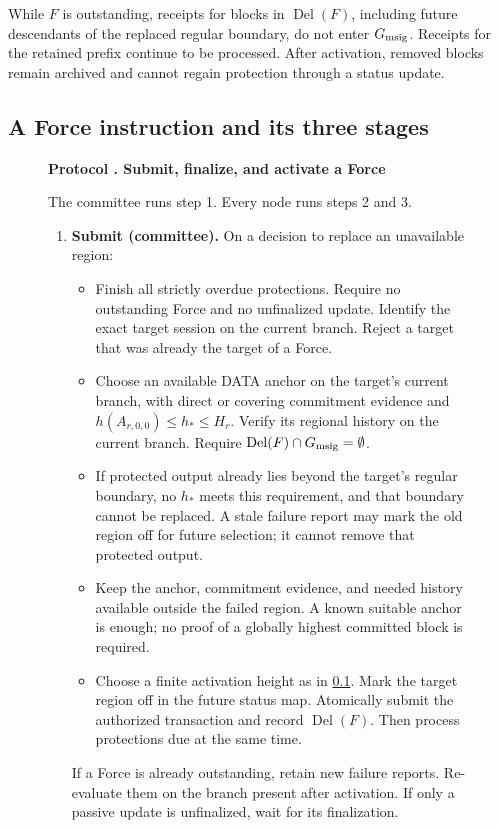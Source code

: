 \documentclass[11pt,a4paper]{article}
\newif\ifrevmarks
\newcommand{\Rv}[1]{\ifrevmarks\leavevmode{\color{rvBlue}#1}\else#1\fi}
\newcommand{\Cid}[1]{\ifrevmarks\textsuperscript{\hyperlink{chg:#1}{\color{rvBlue}\sffamily\scriptsize#1}}\fi}
\newcommand{\Del}{\operatorname{Del}}
\newcounter{protocol}
\newenvironment{protocol}[2]{\begin{figure}[htbp]\refstepcounter{protocol}\label{#1}
\begin{mdframed}[linewidth=.6pt,skipabove=0pt,skipbelow=0pt,
innertopmargin=7pt,innerbottommargin=7pt]\small
\textbf{Protocol \theprotocol. #2}\par\smallskip}{\end{mdframed}\end{figure}}
\begin{document}
\Rv{While $F$ is outstanding, receipts for blocks in $\Del(F)$, including
future descendants of the replaced regular boundary, do not enter
$G_{\rm msig}$.} Receipts for the retained prefix
continue to be processed. After activation, removed blocks remain
archived and cannot regain protection through a status update.

\subsection{A Force instruction and its three stages}
\label{sec:force-stages}

\begin{protocol}{alg:force}{Submit, finalize, and activate a Force}
The committee runs step 1. \Rv{Every node} runs steps 2 and 3.
\begin{enumerate}[label=\textbf{\arabic*)},itemsep=3pt]
\item \textbf{Submit \Rv{(committee)}.} On a decision to replace an unavailable region:
\begin{itemize}
\item Finish all strictly overdue protections. Require no outstanding
Force \Rv{and no unfinalized update}. Identify the exact target
\Rv{session} on the \Rv{current} branch. Reject a target \Rv{that was already
the target of a Force}.
\item Choose an available DATA anchor on the target's current
\Rv{branch}, with direct or covering commitment evidence and
$h(A_{r,0,0})\le h_*\le H_r$. Verify
its regional history on the current branch. \Rv{Require
$\Del(F)\cap G_{\rm msig}=\emptyset$.}
\item If protected output already lies beyond the target's regular
boundary, \Rv{no $h_*$ meets this requirement, and} that boundary cannot be replaced. A stale failure report may
mark the old region off for future selection; it cannot remove that
protected output.
\item Keep the anchor, commitment evidence, and needed history available outside
the failed region. A known suitable anchor is enough; no proof of a
globally highest committed block is required.
\item Choose a finite activation height \Rv{as in \cref{sec:force-stages}}.
Mark the target region off in the future status map. Atomically
submit the authorized transaction and record \Rv{$\Del(F)$}. Then
process protections due at the same time.
\end{itemize}
If a Force is already outstanding, retain new failure reports. Re-evaluate
them on the branch present after activation. \Rv{If only a passive update
is unfinalized, wait for its finalization.}


\end{enumerate}
\end{protocol}
\end{document}
